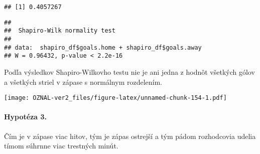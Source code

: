 \documentclass[
]{article}
\newenvironment{Shaded}{\begin{snugshade}}{\end{snugshade}}
\newcommand{\AttributeTok}[1]{\textcolor[rgb]{0.77,0.63,0.00}{#1}}
\newcommand{\ControlFlowTok}[1]{\textcolor[rgb]{0.13,0.29,0.53}{\textbf{#1}}}
\newcommand{\FunctionTok}[1]{\textcolor[rgb]{0.00,0.00,0.00}{#1}}
\newcommand{\NormalTok}[1]{#1}
\newcommand{\OtherTok}[1]{\textcolor[rgb]{0.56,0.35,0.01}{#1}}
\newcommand{\SpecialCharTok}[1]{\textcolor[rgb]{0.00,0.00,0.00}{#1}}
\newcommand{\StringTok}[1]{\textcolor[rgb]{0.31,0.60,0.02}{#1}}
\begin{document}
\begin{verbatim}
## [1] 0.4057267
\end{verbatim}

\begin{Shaded}
\end{Shaded}

\begin{verbatim}
## 
##  Shapiro-Wilk normality test
## 
## data:  shapiro_df$goals.home + shapiro_df$goals.away
## W = 0.96432, p-value < 2.2e-16
\end{verbatim}

Podľa výsledkov Shapiro-Wilkovho testu nie je ani jedna z hodnôt
všetkých gólov a všetkých striel v zápase s normálnym rozdelením.

\begin{Shaded}
\end{Shaded}

\texttt{[image: OZNAL-ver2\_files/figure-latex/unnamed-chunk-154-1.pdf]}

\hypertarget{hypotuxe9za-3.}{%
\paragraph{Hypotéza 3.}\label{hypotuxe9za-3.}}

Čím je v zápase viac hitov, tým je zápas ostrejší a tým pádom
rozhodcovia udelia tímom súhrnne viac trestných minút.
\end{document}
